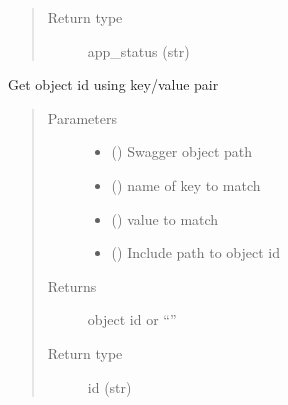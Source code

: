 \documentclass[letterpaper,10pt,english]{sphinxmanual}
\begin{document}
\begin{fulllineitems}
\begin{fulllineitems}
\begin{quote}
\begin{description}
\item[{Return type}] \leavevmode
\sphinxAtStartPar
app\_status (str)

\end{description}\end{quote}

\end{fulllineitems}


\begin{fulllineitems}
\label{\detokenize{b1oph-class:bloxone.b1oph.get_id}}
\sphinxAtStartPar
Get object id using key/value pair
\begin{quote}\begin{description}
\item[{Parameters}] \leavevmode\begin{itemize}
\item {} 
\sphinxAtStartPar
{} () \textendash{} Swagger object path

\item {} 
\sphinxAtStartPar
{} () \textendash{} name of key to match

\item {} 
\sphinxAtStartPar
{} () \textendash{} value to match

\item {} 
\sphinxAtStartPar
{} () \textendash{} Include path to object id

\end{itemize}

\item[{Returns}] \leavevmode
\sphinxAtStartPar
object id or “”

\item[{Return type}] \leavevmode
\sphinxAtStartPar
id (str)


\end{description}
\end{quote}
\end{fulllineitems}
\end{fulllineitems}
\end{document}
